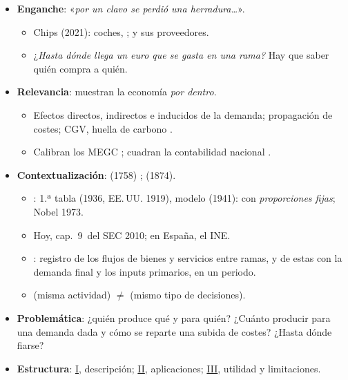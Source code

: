 \documentclass{article}
\begin{document}
\cabecerarepaso
\begin{columnas}

\begin{itemize}
\item \textbf{Enganche}: «\emph{por un clavo se perdió una herradura…}».
  \begin{itemize}
  \item Chips (2021): coches, ; y sus proveedores.
  \item ¿\emph{Hasta dónde llega un euro que se gasta en una rama?} Hay que saber quién compra a quién.
  \end{itemize}
\item \textbf{Relevancia}: muestran la economía \emph{por dentro}.
  \begin{itemize}
  \item Efectos directos, indirectos e inducidos de la demanda; propagación de costes; CGV, huella de carbono .
  \item Calibran los MEGC ; cuadran la contabilidad nacional .
  \end{itemize}
\item \textbf{Contextualización}:  (1758) ;  (1874).
  \begin{itemize}
  \item {}: 1.ª tabla (1936, EE.\,UU. 1919), modelo (1941):  con \emph{proporciones fijas}; Nobel 1973.
  \item Hoy, cap.~9~del SEC 2010; en España, el INE.
  \item {}: registro de los flujos de bienes y servicios entre ramas, y de estas con la demanda final y los inputs primarios, en un periodo.
  \item {} (misma actividad) $\neq$  (mismo tipo de decisiones).
  \end{itemize}
\item \textbf{Problemática}: ¿quién produce qué y para quién? ¿Cuánto producir para una demanda dada y cómo se reparte una subida de costes? ¿Hasta dónde fiarse?
\item \textbf{Estructura}: \hyperref[rep:I]{I}, descripción; \hyperref[rep:II]{II}, aplicaciones; \hyperref[rep:III]{III}, utilidad y limitaciones.
\end{itemize}


\end{columnas}
\end{document}
